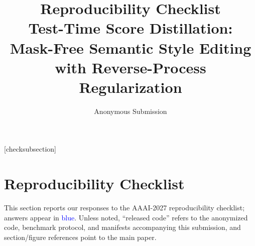 \documentclass[letterpaper]{article} %
\title{Reproducibility Checklist\\Test-Time Score Distillation: Mask-Free
Semantic Style Editing with Reverse-Process Regularization}
\author{Anonymous Submission}
\begin{document}
\maketitle
\setlength{\leftmargini}{20pt}
\makeatletter\def\@listi{\leftmargin\leftmargini \topsep .5em \parsep .5em \itemsep .5em}
\def\@listii{\leftmargin\leftmarginii \labelwidth\leftmarginii \advance\labelwidth-\labelsep \topsep .4em \parsep .4em \itemsep .4em}
\def\@listiii{\leftmargin\leftmarginiii \labelwidth\leftmarginiii \advance\labelwidth-\labelsep \topsep .4em \parsep .4em \itemsep .4em}\makeatother

\renewcommand\thesubsection{\arabic{subsection}}
\renewcommand\labelenumi{\thesubsection.\arabic{enumi}}

[checksubsection]
\makeatletter
\newcommand{\checksubsection}[1]{%
  \refstepcounter{checksubsection}%
  \paragraph{\arabic{checksubsection}. #1}%
  \setcounter{checkitem}{0}%
}
\newcommand{\checkitem}{%
  \refstepcounter{checkitem}%
  \item[\arabic{checksubsection}.\arabic{checkitem}.]%
}
\makeatother
\newcommand{\question}[2]{\normalcolor\checkitem #1 #2 \color{blue}}
\newcommand{\ifyespoints}[1]{\makebox[0pt][l]{\hspace{-15pt}\normalcolor #1}}

\section{Reproducibility Checklist}

This section reports our responses to the AAAI-2027 reproducibility checklist;
answers appear in \textcolor{blue}{blue}. Unless noted, ``released code'' refers
to the anonymized code, benchmark protocol, and manifests accompanying this
submission, and section/figure references point to the main paper.
\end{document}
